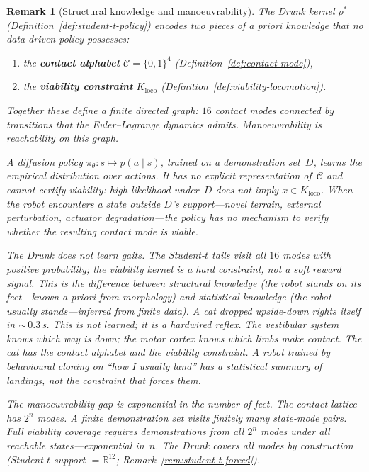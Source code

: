\documentclass[11pt,a4paper]{article}
\newtheorem{remark}[theorem]{Remark}
\newcommand{\R}{\mathbb{R}}
\newcommand{\cC}{\mathcal{C}}
\begin{document}
\begin{remark}[Structural knowledge and manoeuvrability]
\label{rem:structural-knowledge}
The Drunk kernel $\rho^*$
(Definition~\ref{def:student-t-policy})
encodes two pieces of \emph{a priori} knowledge
that no data-driven policy possesses:
\begin{enumerate}[nosep]
\item the \textbf{contact alphabet}
  $\cC = \{0,1\}^4$
  (Definition~\ref{def:contact-mode}),
\item the \textbf{viability constraint}
  $K_{\mathrm{loco}}$
  (Definition~\ref{def:viability-locomotion}).
\end{enumerate}
Together these define a finite directed graph:
$16$ contact modes connected by transitions
that the Euler--Lagrange dynamics admits.
\emph{Manoeuvrability} is reachability on this graph.

A diffusion policy
$\pi_\theta\colon s \mapsto p(a \mid s)$,
trained on a demonstration set~$D$,
learns the empirical distribution over actions.
It has no explicit representation of~$\cC$
and cannot certify viability:
high likelihood under~$D$ does not imply
$x \in K_{\mathrm{loco}}$.
When the robot encounters a state
outside $D$'s support---novel terrain,
external perturbation, actuator degradation---the
policy has no mechanism to verify
whether the resulting contact mode is viable.

The Drunk does not learn gaits.
The Student-$t$ tails
visit all $16$ modes with positive probability;
the viability kernel is a hard constraint,
not a soft reward signal.
This is the difference between
\emph{structural knowledge}
(the robot stands on its feet---known \emph{a priori}
from morphology)
and \emph{statistical knowledge}
(the robot usually stands---inferred
from finite data).
A cat dropped upside-down rights itself
in ${\sim}\,0.3$\,s.
This is not learned; it is a hardwired reflex.
The vestibular system knows which way is down;
the motor cortex knows which limbs make contact.
The cat has the contact alphabet
and the viability constraint.
A robot trained by behavioural cloning
on ``how I usually land''
has a statistical summary of landings,
not the constraint that forces them.

The manoeuvrability gap is exponential
in the number of feet.
The contact lattice has $2^n$ modes.
A finite demonstration set visits
finitely many state-mode pairs.
Full viability coverage requires
demonstrations from all $2^n$ modes
under all reachable states---exponential in~$n$.
The Drunk covers all modes by construction
(Student-$t$ support $= \R^{12}$;
Remark~\ref{rem:student-t-forced}).
\end{remark}
\end{document}

